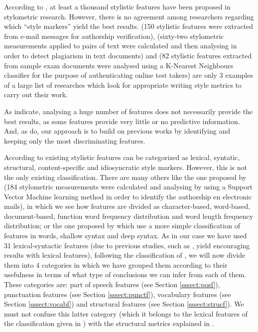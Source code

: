 According to \cite{rudman1997state}, at least a thousand stylistic features have been proposed in stylometric research. However, there is no agreement among researchers regarding which ``style markers'' yield the best results. \cite{chen2011authorship} (150 stylistic features were extracted from e-mail messages for authorship verification), \cite{gruner2005tool} (sixty-two stylometric measurements applied to pairs of text were calculated and then analysing in order to detect plagiarism in text documents) and \cite{canales2011stylometry} (82 stylistic features extracted from sample exam documents were analysed using a K-Nearest Neighbours classifier for the purpose of authenticating online test takers) are only 3 examples of a large list of researches which look for appropriate writing style metrics to carry out their work.

As \cite{brocardo2013authorship} indicate, analysing a huge number of features does not necessarily provide the best results, as some features provide very little or no predictive information. And, as \cite{brocardo2013authorship} do, our approach is to build on previous works by identifying and keeping only the most discriminating features.

According to \cite{abbasi2008writeprints} existing stylistic features can be categorized as lexical, syntatic, structural, content-specific and idiosyncratic style markers. However, this is not the only existing classification. There are many others like the one proposed by \cite{corney2001identifying} (184 stylometric measurements were calculated and analysing by using a Support Vector Machine learning method in order to identify the authorship en electronic mails), in which we see how features are divided as character-based, word-based, document-based, function word frequency distribution and word length frequency distribution; or the one proposed by \cite{cfgstylo} which use a more simple classification of features in words, shallow syntax and deep syntax. As in our case we have used 31 lexical-syntactic features (due to previous studies, such as \cite{homem2011authorship}, yield encouraging results with lexical features), following the classification of \cite{abbasi2008writeprints}, we will now divide them into 4 categories in which we have grouped them according to their usefulness in terms of what type of conclusions we can infer from each of them. These categories are: part of speech features (see Section \ref{sssect:posf}), punctuation features (see Section \ref{sssect:punctf}), vocabulary features (see Section \ref{sssect:vocabf}) and structural features (see Section \ref{sssect:strucf}). We must not confuse this latter category (which it belongs to the lexical features of the classification given in \cite{abbasi2008writeprints}) with the structural metrics explained in \cite{abbasi2008writeprints}.

